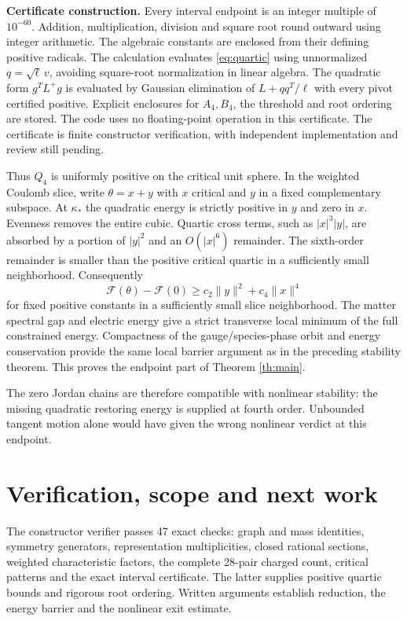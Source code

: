 \documentclass[11pt,a4paper]{article}
\begin{document}
\textbf{Certificate construction.} Every interval endpoint is an integer multiple of $10^{-60}$. Addition, multiplication, division and square root round outward using integer arithmetic. The algebraic constants are enclosed from their defining positive radicals. The calculation evaluates \eqref{eq:quartic} using unnormalized $q=\sqrt\ell\,v$, avoiding square-root normalization in linear algebra. The quadratic form $g^TL^+g$ is evaluated by Gaussian elimination of $L+qq^T/\ell$ with every pivot certified positive. Explicit enclosures for $A_4,B_4$, the threshold and root ordering are stored. The code uses no floating-point operation in this certificate. The certificate is finite constructor verification, with independent implementation and review still pending.

Thus $Q_4$ is uniformly positive on the critical unit sphere. In the weighted Coulomb slice, write $\theta=x+y$ with $x$ critical and $y$ in a fixed complementary subspace. At $\kappa_*$ the quadratic energy is strictly positive in $y$ and zero in $x$. Evenness removes the entire cubic. Quartic cross terms, such as $|x|^3|y|$, are absorbed by a portion of $|y|^2$ and an $O(|x|^6)$ remainder. The sixth-order remainder is smaller than the positive critical quartic in a sufficiently small neighborhood. Consequently
\[
\mathcal F(\theta)-\mathcal F(0)\geq c_2\|y\|^2+c_4\|x\|^4
\]
for fixed positive constants in a sufficiently small slice neighborhood. The matter spectral gap and electric energy give a strict transverse local minimum of the full constrained energy. Compactness of the gauge/species-phase orbit and energy conservation provide the same local barrier argument as in the preceding stability theorem. This proves the endpoint part of Theorem \ref{th:main}.

The zero Jordan chains are therefore compatible with nonlinear stability: the missing quadratic restoring energy is supplied at fourth order. Unbounded tangent motion alone would have given the wrong nonlinear verdict at this endpoint.

\newpage
\section{Verification, scope and next work}
The constructor verifier passes 47 exact checks: graph and mass identities, symmetry generators, representation multiplicities, closed rational sections, weighted characteristic factors, the complete 28-pair charged count, critical patterns and the exact interval certificate. The latter supplies positive quartic bounds and rigorous root ordering. Written arguments establish reduction, the energy barrier and the nonlinear exit estimate.
\end{document}
